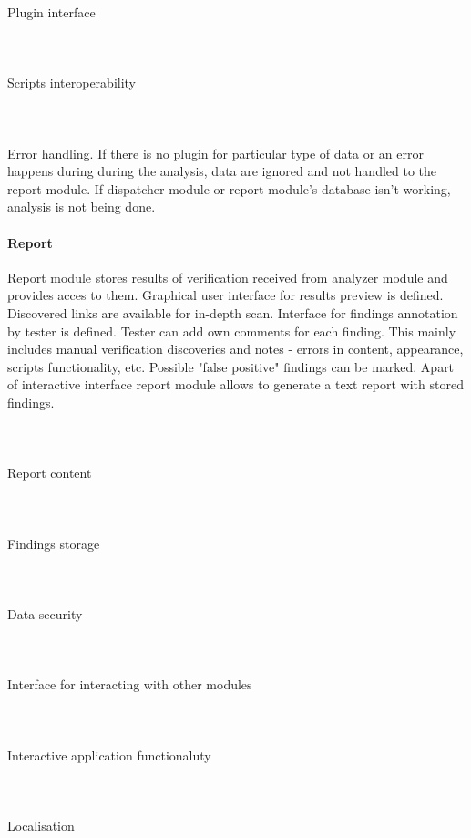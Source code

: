 \documentclass[10pt]{article}
\begin{document}
\paragraph{~}Plugin interface
\paragraph{~}Scripts interoperability
\paragraph{~}Error handling. If there is no plugin for particular type of data or an error happens during during the analysis, data are ignored and not handled to the report module. If dispatcher module or report module's database isn't working, analysis is not being done.
\paragraph{Report} Report module stores results of verification received from analyzer module and provides acces to them. Graphical user interface for results preview is defined. Discovered links are available for in-depth scan. Interface for findings annotation by tester is defined. Tester can add own comments for each finding. This mainly includes manual verification discoveries and notes - errors in content, appearance, scripts functionality, etc. Possible "false positive" findings can be marked. Apart of interactive interface report module allows to generate a text report with stored findings. 
\paragraph{~}Report content
\paragraph{~}Findings storage
\paragraph{~}Data security
\paragraph{~}Interface for interacting with other modules
\paragraph{~}Interactive application functionaluty
\paragraph{~}Localisation
\end{document}
